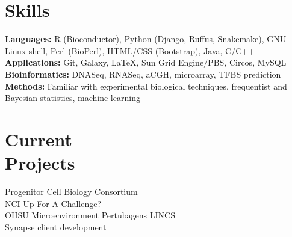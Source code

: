 \documentclass[margin,line]{res}
\begin{document}
\begin{resume}
\section{\sc Skills} 
\textbf{Languages:} R (Bioconductor), Python (Django, Ruffus, Snakemake), GNU Linux shell, Perl (BioPerl), HTML/CSS (Bootstrap), Java, C/C++\\
\textbf{Applications:} Git, Galaxy, \LaTeX, Sun Grid Engine/PBS, Circos, MySQL\\
\textbf{Bioinformatics:} DNASeq, RNASeq, aCGH, microarray, TFBS prediction\\
\textbf{Methods:} Familiar with experimental biological techniques, frequentist and Bayesian statistics, machine learning

\section{\sc Current\\Projects}
Progenitor Cell Biology Consortium\\
NCI Up For A Challenge?\\
OHSU Microenvironment Pertubagens LINCS\\
Synapse client development



\end{resume}
\end{document}
